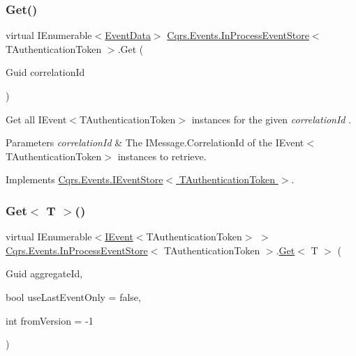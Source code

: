\subsubsection{\texorpdfstring{Get()}{Get()}\hspace{0.1cm}{\footnotesize\ttfamily [2/2]}}
{\footnotesize\ttfamily virtual I\+Enumerable$<$\hyperlink{classCqrs_1_1Events_1_1EventData}{Event\+Data}$>$ \hyperlink{classCqrs_1_1Events_1_1InProcessEventStore}{Cqrs.\+Events.\+In\+Process\+Event\+Store}$<$ T\+Authentication\+Token $>$.Get (\begin{DoxyParamCaption}\item[{Guid}]{correlation\+Id }\end{DoxyParamCaption})\hspace{0.3cm}{\ttfamily [virtual]}}



Get all I\+Event$<$\+T\+Authentication\+Token$>$ instances for the given {\itshape correlation\+Id} . 


\begin{DoxyParams}{Parameters}
{\em correlation\+Id} & The I\+Message.\+Correlation\+Id of the I\+Event$<$\+T\+Authentication\+Token$>$ instances to retrieve.\\
\hline
\end{DoxyParams}


Implements \hyperlink{interfaceCqrs_1_1Events_1_1IEventStore_af398bb6768fa661ad97a9fa9ecfbd9fb_af398bb6768fa661ad97a9fa9ecfbd9fb}{Cqrs.\+Events.\+I\+Event\+Store$<$ T\+Authentication\+Token $>$}.

\mbox{\label{classCqrs_1_1Events_1_1InProcessEventStore_ab3df0015ad2f5950f5590f96384009e7_ab3df0015ad2f5950f5590f96384009e7}} 
\subsubsection{\texorpdfstring{Get$<$ T $>$()}{Get< T >()}}
{\footnotesize\ttfamily virtual I\+Enumerable$<$\hyperlink{interfaceCqrs_1_1Events_1_1IEvent}{I\+Event}$<$T\+Authentication\+Token$>$ $>$ \hyperlink{classCqrs_1_1Events_1_1InProcessEventStore}{Cqrs.\+Events.\+In\+Process\+Event\+Store}$<$ T\+Authentication\+Token $>$.\hyperlink{classCqrs_1_1Events_1_1InProcessEventStore_a1a57a9059c5489fd891b479468b7e9ed_a1a57a9059c5489fd891b479468b7e9ed}{Get}$<$ T $>$ (\begin{DoxyParamCaption}\item[{Guid}]{aggregate\+Id,  }\item[{bool}]{use\+Last\+Event\+Only = {\ttfamily false},  }\item[{int}]{from\+Version = {\ttfamily -\/1} }\end{DoxyParamCaption})\hspace{0.3cm}{\ttfamily [virtual]}}



